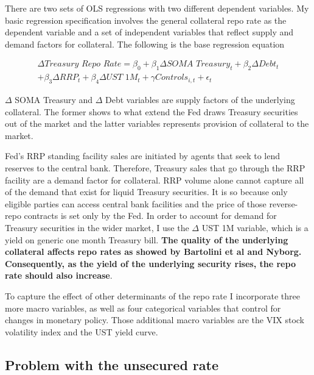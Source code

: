 \documentclass[11pt,a4paper,english,oneside]{article}
\begin{document}
There are two sets of OLS regressions with two different dependent variables. My basic regression specification involves the general collateral repo rate as the dependent variable and a set of independent variables that reflect supply and demand factors for collateral. The following is the base regression equation

\begin{equation} \label{eq:1}
  \begin{gathered}
  \Delta \textit{Treasury Repo Rate} = \beta_0 + \beta_1 \Delta \textit{SOMA Treasury}_t + \beta_2 \Delta \textit{Debt}_t \\ + \beta_3 \Delta \textit{RRP}_t  + \beta_4 \Delta \textit{UST 1M}_t + \gamma \textit{Controls}_{i,t} + \epsilon_{t}
  \end{gathered}
\end{equation}

$\Delta$ SOMA Treasury and $\Delta$ Debt variables are supply factors of the underlying collateral. The former shows to what extend the Fed draws Treasury securities out of the market and the latter variables represents provision of collateral to the market.

Fed's RRP standing facility sales are initiated by agents that seek to lend reserves to the central bank. Therefore, Treasury sales that go through the RRP facility are a demand factor for collateral. RRP volume alone cannot capture all of the demand that exist for liquid Treasury securities. It is so because only eligible parties can access central bank facilities and the price of those reverse-repo contracts is set only by the Fed. In order to account for demand for Treasury securities in the wider market, I use the $\Delta$ UST 1M variable, which is a yield on generic one month Treasury bill. \textbf{The quality of the underlying collateral affects repo rates as showed by Bartolini et al and Nyborg. Consequently, as the yield of the underlying security rises, the repo rate should also increase}.

To capture the effect of other determinants of the repo rate I incorporate three more macro variables, as well as four categorical variables that control for changes in monetary policy. Those additional macro variables are the VIX stock volatility index and the UST yield curve.

\subsection{Problem with the unsecured rate} \label{sec:unsecured}
\end{document}
